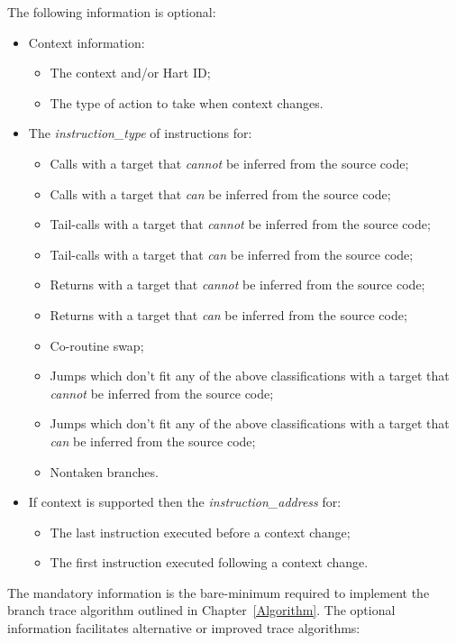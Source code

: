 The following information is optional:

\begin{itemize}
  \item Context information:
    \begin{itemize}
      \item The context and/or Hart ID;
      \item The type of action to take when context changes.
    \end{itemize}
  \item The \textit{instruction\_type} of instructions for:
    \begin{itemize}
      \item Calls with a target that \textit{cannot} be inferred from the source code;
      \item Calls with a target that \textit{can} be inferred from the source code;
      \item Tail-calls with a target that \textit{cannot} be inferred from the source code;
      \item Tail-calls with a target that \textit{can} be inferred from the source code;
      \item Returns with a target that \textit{cannot} be inferred from the source code;
      \item Returns with a target that \textit{can} be inferred from the source code;
      \item Co-routine swap;
      \item Jumps which don't fit any of the above classifications with a target that \textit{cannot} be inferred from the source code;
      \item Jumps which don't fit any of the above classifications with a target that \textit{can} be inferred from the source code;
      \item Nontaken branches.
    \end{itemize}
  \item If context is supported then the \textit{instruction\_address} for:
    \begin{itemize}
      \item The last instruction executed before a context change;
      \item The first instruction executed following a context change.
    \end{itemize}
\end{itemize}

The mandatory information is the bare-minimum required to implement the branch trace algorithm outlined in Chapter~\ref{Algorithm}.  
The optional information facilitates alternative or improved trace algorithms:

